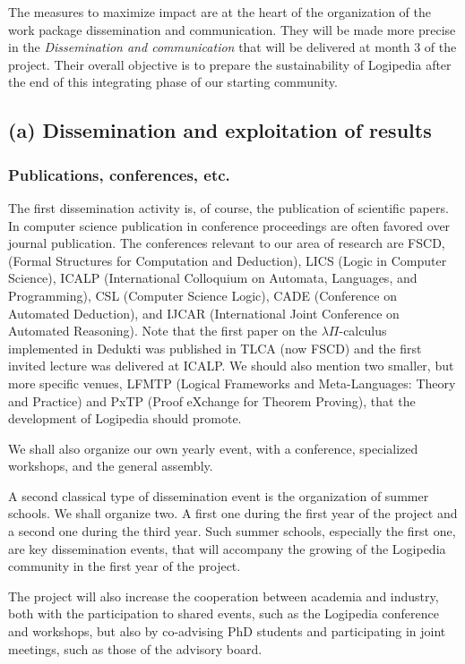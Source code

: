 The measures to maximize impact are at the heart of the organization
of the work package dissemination and communication. They will be made
more precise in the {\em Dissemination and communication} that will be
delivered at month 3 of the project. Their overall objective is to
prepare the sustainability of Logipedia after the end of this
integrating phase of our starting community.

\subsection*{(a) Dissemination and exploitation of results}
\label{sec:dissemination}

\subsubsection*{Publications, conferences, etc.}

The first dissemination activity is, of course, the publication of
scientific papers. In computer science publication in conference
proceedings are often favored over journal publication. The
conferences relevant to our area of research are FSCD, (Formal
Structures for Computation and Deduction), LICS (Logic in Computer
Science), ICALP (International Colloquium on Automata, Languages, and
Programming), CSL (Computer Science Logic), CADE (Conference on
Automated Deduction), and IJCAR (International Joint Conference on
Automated Reasoning). Note that the first paper on the $\lambda
\Pi$-calculus implemented in Dedukti was published in TLCA (now FSCD)
and the first invited lecture was delivered at ICALP. We should also
mention two smaller, but more specific venues, LFMTP (Logical
Frameworks and Meta-Languages: Theory and Practice) and PxTP (Proof
eXchange for Theorem Proving), that the development of Logipedia
should promote.

We shall also organize our own yearly event, with a conference,
specialized workshops, and the general assembly.

A second classical type of dissemination event is the organization of
summer schools. We shall organize two. A first one during the first
year of the project and a second one during the third year. Such summer
schools, especially the first one, are key dissemination events, that
will accompany the growing of the Logipedia community in the first
year of the project.

The project will also increase the cooperation between academia and
industry, both with the participation to shared events, such as the
Logipedia conference and workshops, but also by co-advising PhD students
and participating in joint meetings, such as those of the advisory
board.

